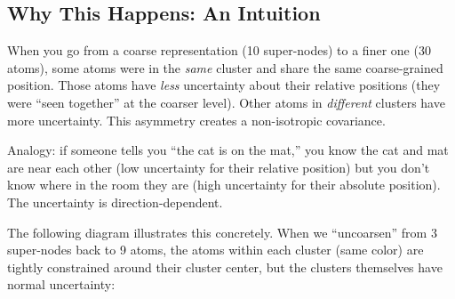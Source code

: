 \documentclass[12pt,a4paper]{article}
\begin{document}
\begin{center}
\end{center}

\subsection{Why This Happens: An Intuition}

\begin{insightbox}[Intuition]
When you go from a coarse representation (10 super-nodes) to a finer one (30 atoms), some atoms were in the \emph{same} cluster and share the same coarse-grained position. Those atoms have \emph{less} uncertainty about their relative positions (they were ``seen together'' at the coarser level). Other atoms in \emph{different} clusters have more uncertainty. This asymmetry creates a non-isotropic covariance.

Analogy: if someone tells you ``the cat is on the mat,'' you know the cat and mat are near each other (low uncertainty for their relative position) but you don't know where in the room they are (high uncertainty for their absolute position). The uncertainty is direction-dependent.
\end{insightbox}

The following diagram illustrates this concretely. When we ``uncoarsen'' from 3 super-nodes back to 9 atoms, the atoms within each cluster (same color) are tightly constrained around their cluster center, but the clusters themselves have normal uncertainty:
\end{document}
